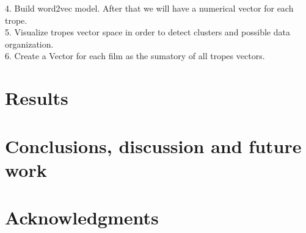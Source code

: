 \documentclass[letterpaper]{article}
\begin{document}
	4. Build word2vec model. After that we will have a numerical vector for each trope. \\
	5. Visualize tropes vector space in order to detect clusters and possible data organization. \\ 
	6. Create a Vector for each film as the sumatory of all tropes vectors. \\

        \section{Results}
        \label{sec:res}
        
        \section{Conclusions, discussion and future work}
        
	\section{Acknowledgments}
	
	
	
	
\end{document}
